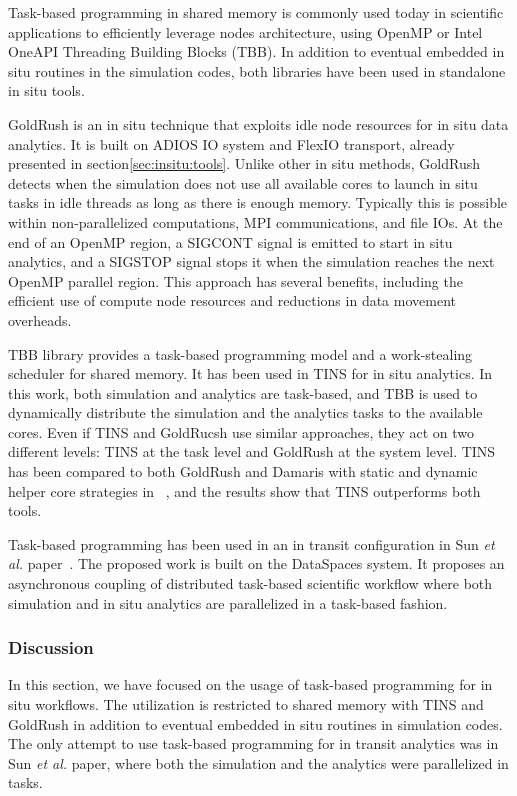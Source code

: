 Task-based programming in shared memory is commonly used today in scientific applications to efficiently leverage nodes architecture, using OpenMP\cite{openMP} or Intel OneAPI Threading Building Blocks (TBB)\cite{Robison2011tbb}. In addition to eventual embedded in situ routines in the simulation codes, both libraries have been used in standalone in situ tools. 

GoldRush\cite{zheng2013goldrush} is an in situ technique that exploits idle node resources for in situ data analytics. It is built on ADIOS IO system and FlexIO transport, already presented in section\ref{sec:insitu:tools}. Unlike other in situ methods, GoldRush detects when the simulation does not use all available cores to launch in situ tasks in idle threads as long as there is enough memory. Typically this is possible within non-parallelized computations, MPI communications, and file IOs. At the end of an OpenMP region, a SIGCONT signal is emitted to start in situ analytics, and a SIGSTOP signal stops it when the simulation reaches the next OpenMP parallel region. 
This approach has several benefits, including the efficient use of compute node resources and reductions in data movement overheads.

TBB library provides a task-based programming model and a work-stealing scheduler for shared memory. It has been used in TINS\cite{yokota_tins_2018, dirand2018integration} for in situ analytics. In this work, both simulation and analytics are task-based, and TBB is used to dynamically distribute the simulation and the analytics tasks to the available cores. Even if TINS and GoldRucsh use similar approaches, they act on two different levels: TINS at the task level and GoldRush at the system level. TINS has been compared to both GoldRush and Damaris with static and dynamic helper core strategies in  ~\cite{dirand2018tins}, and the results show that TINS outperforms both tools.

Task-based programming has been used in an in transit configuration in Sun \textit{et al.} paper~\cite{staging_2016_manish}. The proposed work is built on the DataSpaces system. It proposes an asynchronous coupling of distributed task-based scientific workflow where both simulation and in situ analytics are parallelized in a task-based fashion. 

\subsubsection{Discussion}
In this section, we have focused on the usage of task-based programming for in situ workflows. The utilization is restricted to shared memory with TINS and GoldRush in addition to eventual embedded in situ routines in simulation codes. 
The only attempt to use task-based programming for in transit analytics was in Sun \textit{et al.} paper, where both the simulation and the analytics were parallelized in tasks. 

